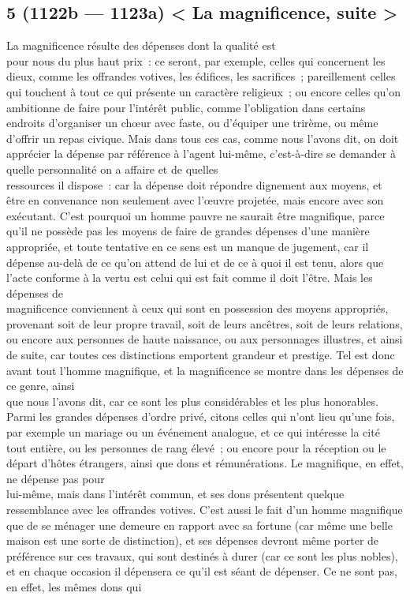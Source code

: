\documentclass[french,twoside]{book} %
\begin{document}
\subsection[{5 (1122b — 1123a) < La magnificence, suite >}]{5 (1122b — 1123a) < La magnificence, suite >}
\noindent La magnificence résulte des dépenses dont la qualité est \\
pour nous du plus haut prix : ce seront, par exemple, celles qui concernent les dieux, comme les offrandes votives, les édifices, les sacrifices ; pareillement celles qui touchent à tout ce qui présente un caractère religieux ; ou encore celles qu’on ambitionne de faire pour l’intérêt public, comme l’obligation dans certains endroits d’organiser un chœur avec faste, ou d’équiper une trirème, ou même d’offrir un repas civique. Mais dans tous ces cas, comme nous l’avons dit, on doit apprécier la dépense par référence à l’agent lui-même, c’est-à-dire se demander à quelle personnalité on a affaire et de quelles \\
ressources il dispose : car la dépense doit répondre dignement aux moyens, et être en convenance non seulement avec l’œuvre projetée, mais encore avec son exécutant. C’est pourquoi un homme pauvre ne saurait être magnifique, parce qu’il ne possède pas les moyens de faire de grandes dépenses d’une manière appropriée, et toute tentative en ce sens est un manque de jugement, car il dépense au-delà de ce qu’on attend de lui et de ce à quoi il est tenu, alors que l’acte conforme à la vertu est celui qui est fait comme il doit l’être. Mais les dépenses de \\
magnificence conviennent à ceux qui sont en possession des moyens appropriés, provenant soit de leur propre travail, soit de leurs ancêtres, soit de leurs relations, ou encore aux personnes de haute naissance, ou aux personnages illustres, et ainsi de suite, car toutes ces distinctions emportent grandeur et prestige. Tel est donc avant tout l’homme magnifique, et la magnificence se montre dans les dépenses de ce genre, ainsi \\
que nous l’avons dit, car ce sont les plus considérables et les plus honorables. Parmi les grandes dépenses d’ordre  privé, citons celles qui n’ont lieu qu’une fois, par exemple un mariage ou un événement analogue, et ce qui intéresse la cité tout entière, ou les personnes de rang élevé ; ou encore pour la réception ou le départ d’hôtes étrangers, ainsi que dons et rémunérations. Le magnifique, en effet, ne dépense pas pour \\
lui-même, mais dans l’intérêt commun, et ses dons présentent quelque ressemblance avec les offrandes votives. C’est aussi le fait d’un homme magnifique que de se ménager une demeure en rapport avec sa fortune (car même une belle maison est une sorte de distinction), et ses dépenses devront même porter de préférence sur ces travaux, qui sont destinés à durer (car ce sont les plus nobles), et en chaque occasion il dépensera ce qu’il est séant de dépenser. Ce ne sont pas, en effet, les mêmes dons qui \\
\end{document}
